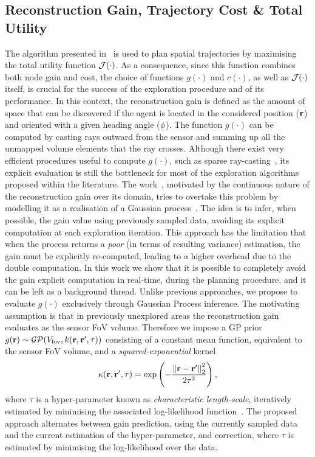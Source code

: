 \subsection{Reconstruction Gain, Trajectory Cost \& Total Utility}%
\label{SEC:EXPLORATION-COST-FUNCTIONS}
The algorithm presented in~ is used to plan spatial trajectories by maximising
the total utility function $\mathcal{J}(\cdot)$. As a consequence, since this function combines both node gain and cost,
the choice of functions $g(\cdot)$ and $c(\cdot)$, as well as $\mathcal{J}(\cdot)$ itself, is crucial for the success of the exploration
procedure and of its performance. In this context, the reconstruction gain is defined as the amount of space that can be discovered
if the agent is located in the considered position ($\mathbf{r}$) and oriented with a given heading angle ($\phi$).
The function $g(\cdot)$ can be computed by casting rays outward from the sensor and summing up all the unmapped volume elements that
the ray crosses. Although there exist very efficient procedures useful to compute $g(\cdot)$, such as sparse
ray-casting~\cite{selin2019efficient}, its explicit evaluation is still the bottleneck for most of the exploration algorithms proposed
within the literature. The work~\cite{selin2019efficient}, motivated by the continuous nature of the reconstruction gain over its domain,
tries to overtake this problem by modelling it as a realisation of a Gaussian process~\cite{rasmussen2003gaussian}.
The idea is to infer, when possible, the gain value using previously sampled data, avoiding its explicit computation at each exploration
iteration. This approach has the limitation that when the process returns a \emph{poor} (in terms of resulting variance) estimation,
the gain must be explicitly re-computed, leading to a higher overhead due to the double computation. In this work we show that it is
possible to completely avoid the gain explicit computation in real-time, during the planning procedure, and it can be left as a background
thread. Unlike previous approaches, we propose to evaluate $g(\cdot)$ exclusively through Gaussian Process inference.
The motivating assumption is that in previously unexplored areas the reconstruction gain evaluates as the sensor FoV volume.
Therefore we impose a GP prior $g(\mathbf{r}) \sim \mathcal{GP}(V_{\text{fov}}, k(\mathbf{r}, \mathbf{r}', \tau))$ consisting of a constant mean function,
equivalent to the sensor FoV volume, and a \emph{squared-exponential} kernel
\begin{equation*}
	\kappa(\mathbf{r}, \mathbf{r}', \tau) = \exp \left( - \frac{\left \lVert {\mathbf{r}- \mathbf{r}'} \right \rVert^2_2 }{2\tau^2} \right),
\end{equation*}
where $\tau$ is a hyper-parameter known as \emph{characteristic length-scale}, iteratively estimated by minimising the associated log-likelihood
function~\cite{rasmussen2003gaussian}. The proposed approach alternates between gain prediction, using the currently sampled data and
the current estimation of the hyper-parameter, and correction, where $\tau$ is estimated by minimising the log-likelihood over the data.

